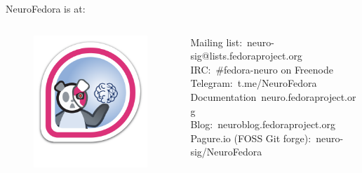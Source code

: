 \begin{frame}[c]{NeuroFedora is at:}
  \begin{columns}
   \begin{column}{0.3\textwidth}
      \begin{figure}[h]
        \centering
        \includegraphics[width=\linewidth]{images/NeuroFedoraBadge.png}
      \end{figure}
    \end{column}
    \begin{column}{0.8\textwidth}
      \textcolor{FedoraBlue}{Mailing list:\ neuro-sig@lists.fedoraproject.org}\\
      \textcolor{FirstGreen}{IRC:\ \#fedora-neuro on Freenode}\\
      \textcolor{FeaturesOrange}{Telegram:\ t.me/NeuroFedora}\\
      \textcolor{FriendsMagenta}{Documentation\ neuro.fedoraproject.org}\\
      \textcolor{FirstGreen}{Blog:\ neuroblog.fedoraproject.org}\\
      \textcolor{FeaturesOrange}{Pagure.io (FOSS Git forge):\ neuro-sig/NeuroFedora}
    \end{column}
  \end{columns}
\end{frame}


